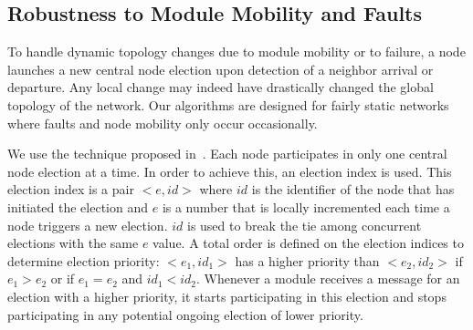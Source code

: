 
\subsection{Robustness to Module Mobility and Faults}

To handle dynamic topology changes due to module mobility or to failure, a node launches a new central node election upon detection of a neighbor arrival or departure. Any local change may indeed have drastically changed the global topology of the network. Our algorithms are designed for fairly static networks where faults and node mobility only occur occasionally.

We use the technique proposed in~\cite{vasudevan2004design}. Each node participates in only one central node election at a time. In order to achieve this, an election index is used. This election index is a pair ${<}e,id{>}$ where $id$ is the identifier of the node that has initiated the election and $e$ is a number that is locally incremented each time a node triggers a new election. $id$ is used to break the tie among concurrent elections with the same $e$ value. A total order is defined on the election indices to determine election priority: ${<}e_1,id_1{>}$ has a higher priority than ${<}e_2,id_2{>}$ if $e_1 > e_2$ or if $e_1 = e_2$ and $id_1 < id_2$. Whenever a module receives a message for an election with a higher priority, it starts participating in this election and stops participating in any potential ongoing election of lower priority. 

